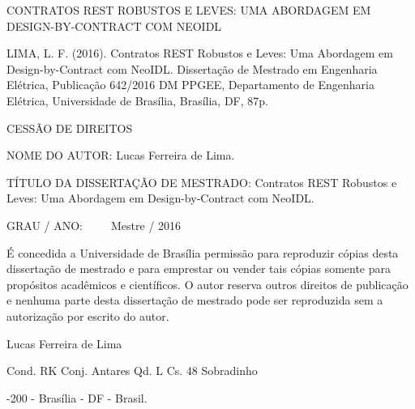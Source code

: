 \vspace{-1mm}

\noindent CONTRATOS REST ROBUSTOS E LEVES: UMA ABORDAGEM EM
DESIGN-BY-CONTRACT COM NEOIDL

\noindent  LIMA, L. F. (2016). Contratos REST Robustos e Leves: Uma
Abordagem em Design-by-Contract com NeoIDL. Dissertação de Mestrado em
Engenharia Elétrica, Publicação 642/2016 DM PPGEE, Departamento de Engenharia Elétrica,
Universidade de Brasília, Brasília, DF, 87p.



\vspace{6mm}

\noindent \begin{bf} \MakeUppercase{Cessão de Direitos} \end{bf}

\vspace{5mm}

\noindent NOME DO AUTOR: Lucas Ferreira de Lima.
\vspace{6mm}

\noindent TÍTULO DA DISSERTAÇÃO DE MESTRADO: Contratos REST Robustos e Leves: Uma
Abordagem em Design-by-Contract com NeoIDL. 

\vspace{3mm}
\noindent GRAU / ANO:~ ~ ~ Mestre / 2016

\vspace{5mm}

\noindent É concedida a Universidade de Brasília permissão para reproduzir
cópias desta dissertação de mestrado e para emprestar ou vender tais cópias
somente para propósitos acadêmicos e científicos. O autor reserva outros
direitos de publicação e nenhuma parte desta dissertação de mestrado pode ser
reproduzida sem a autorização por escrito do autor.

\vspace{5mm}

\noindent \underline{\hspace{65mm}}

\vspace{-2mm}

\noindent  Lucas Ferreira de Lima
   \vspace{-2mm}

\noindent Cond. RK Conj. Antares Qd. L Cs. 48 Sobradinho 
    \vspace{-2mm}
    
-200 - Brasília - DF - Brasil.

\pagebreak


